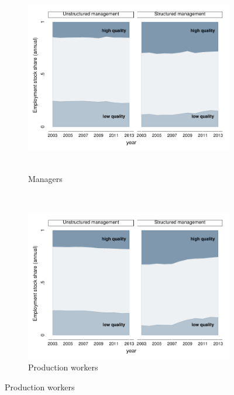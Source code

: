 \clearpage
	\begin{figure}[h]
		\centering
		\caption{Quality distribution of managers and production workers in continuing jobs}
		\label{fig:stayer_shares}
		\begin{subfigure}[b]{0.9\textwidth}
		  \centering
		  \caption{Managers}
		  \includegraphics{./exhibits/fig_stayer_shares_mngr}\
		\end{subfigure}
		\ \\
		\begin{subfigure}[b]{0.9\textwidth}
		  \centering
		  \caption{Production workers}
		  \includegraphics{./exhibits/fig_stayer_shares_labr}
		\end{subfigure}
	\end{figure}

